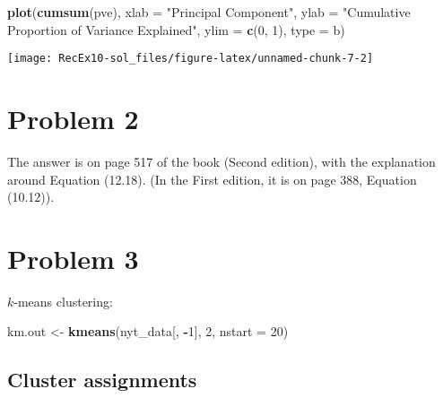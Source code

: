 \documentclass[
]{article}
\newenvironment{Shaded}{\begin{snugshade}}{\end{snugshade}}
\newcommand{\AttributeTok}[1]{\textcolor[rgb]{0.13,0.29,0.53}{#1}}
\newcommand{\DecValTok}[1]{\textcolor[rgb]{0.00,0.00,0.81}{#1}}
\newcommand{\FunctionTok}[1]{\textcolor[rgb]{0.13,0.29,0.53}{\textbf{#1}}}
\newcommand{\NormalTok}[1]{#1}
\newcommand{\OtherTok}[1]{\textcolor[rgb]{0.56,0.35,0.01}{#1}}
\newcommand{\SpecialCharTok}[1]{\textcolor[rgb]{0.81,0.36,0.00}{\textbf{#1}}}
\newcommand{\StringTok}[1]{\textcolor[rgb]{0.31,0.60,0.02}{#1}}
\begin{document}
\begin{Shaded}
\begin{Highlighting}[]
\FunctionTok{plot}\NormalTok{(}\FunctionTok{cumsum}\NormalTok{(pve), }
     \AttributeTok{xlab =} \StringTok{"Principal Component"}\NormalTok{, }
     \AttributeTok{ylab =} \StringTok{"Cumulative Proportion of Variance Explained"}\NormalTok{, }
     \AttributeTok{ylim =} \FunctionTok{c}\NormalTok{(}\DecValTok{0}\NormalTok{, }\DecValTok{1}\NormalTok{),}
     \AttributeTok{type =} \StringTok{\textquotesingle{}b\textquotesingle{}}\NormalTok{)}
\end{Highlighting}
\end{Shaded}

\begin{center}\texttt{[image: RecEx10-sol\_files/figure-latex/unnamed-chunk-7-2]} \end{center}

\section{Problem 2}\label{problem-2}

The answer is on page 517 of the book (Second edition), with the
explanation around Equation (12.18). (In the First edition, it is on
page 388, Equation (10.12)).

\section{Problem 3}\label{problem-3}

\(k\)-means clustering:

\begin{Shaded}
\begin{Highlighting}[]
\NormalTok{km.out }\OtherTok{\textless{}{-}} \FunctionTok{kmeans}\NormalTok{(nyt\_data[, }\SpecialCharTok{{-}}\DecValTok{1}\NormalTok{], }\DecValTok{2}\NormalTok{, }\AttributeTok{nstart =} \DecValTok{20}\NormalTok{)}
\end{Highlighting}
\end{Shaded}

\subsection{Cluster assignments}\label{cluster-assignments}

\begin{Shaded}
\end{Shaded}
\end{document}
